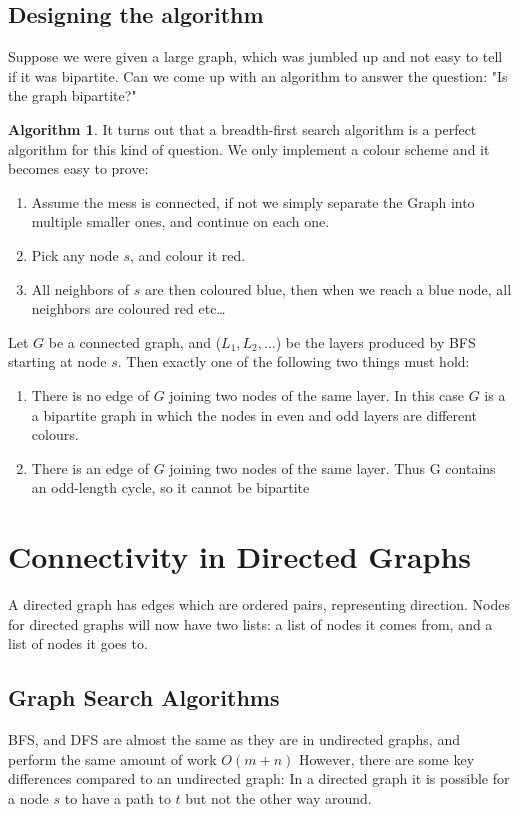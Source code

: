 \documentclass{report}
\theoremstyle{definition}
\newtheorem*{alg}{Algorithm}
\begin{document}
		\subsection{Designing the algorithm}
			Suppose we were given a large graph, which was jumbled up and not easy to tell if it was bipartite. Can we come up
			with an algorithm to answer the question: "Is the graph bipartite?"
			\begin{alg}
				It turns out that a breadth-first search algorithm is a perfect algorithm for this kind of question. We only implement a 
				colour scheme and it becomes easy to prove:
				\begin{enumerate}
					\item Assume the mess is connected, if not we simply separate the Graph into multiple smaller ones, and continue
						on each one.
					\item Pick any node $s$, and colour it red.
					\item All neighbors of $s$ are then coloured blue, then when we reach a blue node, all neighbors are coloured red
						etc\dots
				\end{enumerate}
				Let $G$ be a connected graph, and ($L_1, L_2, \dots$) be the layers produced by BFS starting at node $s$. Then
				exactly one of the following two things must hold:
				\begin{enumerate}
					\item There is no edge of $G$ joining two nodes of the same layer. In this case $G$ is a a bipartite
						graph in which the nodes in even and odd layers are different colours.
					\item There is an edge of $G$ joining two nodes of the same layer. Thus G contains an odd-length
						cycle, so it cannot be bipartite
				\end{enumerate}
			\end{alg}
	\section{Connectivity in Directed Graphs}
		A directed graph has edges which are ordered pairs, representing direction. Nodes for directed graphs
		will now have two lists: a list of nodes it comes from, and a list of nodes it goes to.
		\subsection{Graph Search Algorithms}
			BFS, and DFS are almost the same as they are in undirected graphs, and perform the same amount of work $O(m+n)$
			However, there are some key differences compared to an undirected graph:  In a directed graph it is possible for a
			node $s$ to have a path to $t$ but not the other way around.
\end{document}
